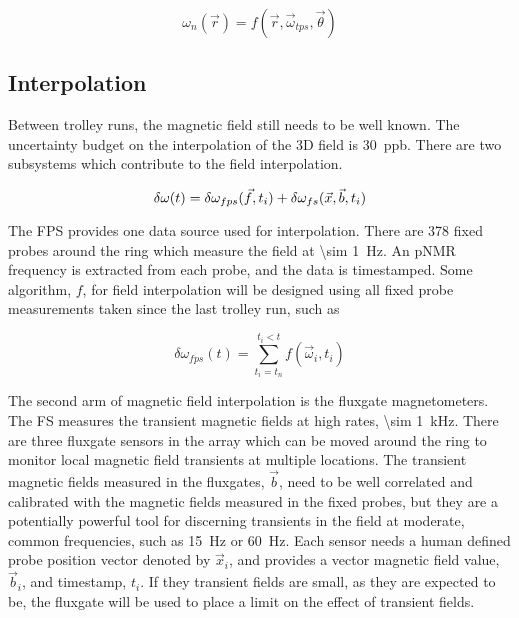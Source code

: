 \begin{equation}
\label{eqn:field-3d-trolley}
\omega_{n}(\vec{r}) = f(\vec{r}, \vec{\omega}_{tps}, \vec{\theta})
\end{equation}

\subsection{Interpolation}

Between trolley runs, the magnetic field still needs to be well known.  The uncertainty budget on the interpolation of the 3D field is \SI{30}{ppb}.  There are two subsystems which contribute to the field interpolation.

\begin{equation}
\label{eqn:field-interpolation}
\delta \omega(t) = \delta \omega_{fps}(\vec{f}, t_i) \\
+ \delta \omega_{fs}(\vec{x}, \vec{b}, t_i)
\end{equation}

The FPS provides one data source used for interpolation.  There are 378 fixed probes around the ring which measure the field at \SI{\sim 1}{\Hz}.  An pNMR frequency is extracted from each probe, and the data is timestamped.  Some algorithm, $f$, for field interpolation will be designed using all fixed probe measurements taken since the last trolley run, such as

\begin{equation}
\label{eqn:field-interpolation-fps}
\delta \omega_{fps}(t) = \sum_{t_i = t_n}^{t_i < t} f(\vec{\omega}_i, t_i)
\end{equation}

The second arm of magnetic field interpolation is the fluxgate magnetometers.  The FS measures the transient magnetic fields at high rates, \SI{\sim 1}{\kHz}.  There are three fluxgate sensors in the array which can be moved around the ring to monitor local magnetic field transients at multiple locations.  The transient magnetic fields measured in the fluxgates, $\vec{b}$, need to be well correlated and calibrated with the magnetic fields measured in the fixed probes, but they are a potentially powerful tool for discerning transients in the field at moderate, common frequencies, such as \SI{15}{\Hz} or \SI{60}{\Hz}.  Each sensor needs a human defined probe position vector denoted by $\vec{x}_i$, and provides a vector magnetic field value, $\vec{b}_i$, and timestamp, $t_i$.  If they transient fields are small, as they are expected to be, the fluxgate will be used to place a limit on the effect of transient fields.

